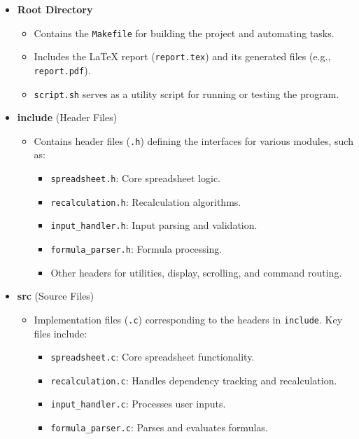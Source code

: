 \documentclass{article}
\begin{document}
\begin{itemize}
    \item \textbf{Root Directory}
    \begin{itemize}
        \item Contains the \texttt{Makefile} for building the project and automating tasks.
        \item Includes the LaTeX report (\texttt{report.tex}) and its generated files (e.g., \texttt{report.pdf}).
        \item \texttt{script.sh} serves as a utility script for running or testing the program.
    \end{itemize}

    \item \textbf{include} (Header Files)
    \begin{itemize}
        \item Contains header files (\texttt{.h}) defining the interfaces for various modules, such as:
        \begin{itemize}
            \item \texttt{spreadsheet.h}: Core spreadsheet logic.
            \item \texttt{recalculation.h}: Recalculation algorithms.
            \item \texttt{input\_handler.h}: Input parsing and validation.
            \item \texttt{formula\_parser.h}: Formula processing.
            \item Other headers for utilities, display, scrolling, and command routing.
        \end{itemize}
    \end{itemize}

    \item \textbf{src} (Source Files)
    \begin{itemize}
        \item Implementation files (\texttt{.c}) corresponding to the headers in \texttt{include}. Key files include:
        \begin{itemize}
            \item \texttt{spreadsheet.c}: Core spreadsheet functionality.
            \item \texttt{recalculation.c}: Handles dependency tracking and recalculation.
            \item \texttt{input\_handler.c}: Processes user inputs.
            \item \texttt{formula\_parser.c}: Parses and evaluates formulas.
        \end{itemize}
    \end{itemize}


\end{itemize}
\end{document}

